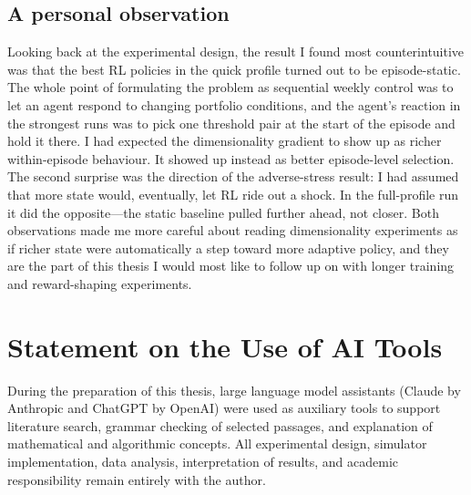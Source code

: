 \documentclass[12pt,a4paper]{article}
\begin{document}
\subsection*{A personal observation}

Looking back at the experimental design, the result I found most counterintuitive was that the best RL policies in the quick profile turned out to be episode-static. The whole point of formulating the problem as sequential weekly control was to let an agent respond to changing portfolio conditions, and the agent's reaction in the strongest runs was to pick one threshold pair at the start of the episode and hold it there. I had expected the dimensionality gradient to show up as richer within-episode behaviour. It showed up instead as better episode-level selection. The second surprise was the direction of the adverse-stress result: I had assumed that more state would, eventually, let RL ride out a shock. In the full-profile run it did the opposite---the static baseline pulled further ahead, not closer. Both observations made me more careful about reading dimensionality experiments as if richer state were automatically a step toward more adaptive policy, and they are the part of this thesis I would most like to follow up on with longer training and reward-shaping experiments.

\section*{Statement on the Use of AI Tools}

During the preparation of this thesis, large language model assistants (Claude by Anthropic and ChatGPT by OpenAI) were used as auxiliary tools to support literature search, grammar checking of selected passages, and explanation of mathematical and algorithmic concepts. All experimental design, simulator implementation, data analysis, interpretation of results, and academic responsibility remain entirely with the author.



\end{document}
